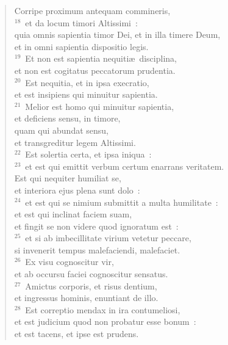  \begin{flushleft}\begin{verse}Corripe proximum antequam commineris,\\
${}^{18}$~et da locum timori Altissimi~:\\ quia omnis sapientia timor Dei, et in illa timere Deum,\\ et in omni sapientia dispositio legis.\\
${}^{19}$~Et non est sapientia nequiti\ae\ disciplina,\\ et non est cogitatus peccatorum prudentia.\\
${}^{20}$~Est nequitia, et in ipsa execratio,\\ et est insipiens qui minuitur sapientia.\\
${}^{21}$~Melior est homo qui minuitur sapientia,\\ et deficiens sensu, in timore,\\ quam qui abundat sensu,\\ et transgreditur legem Altissimi.\\
${}^{22}$~Est solertia certa, et ipsa iniqua~:\\
${}^{23}$~et est qui emittit verbum certum enarrans veritatem.\\ Est qui nequiter humiliat se,\\ et interiora ejus plena sunt dolo~:\\
${}^{24}$~et est qui se nimium submittit a multa humilitate~:\\ et est qui inclinat faciem suam,\\ et fingit se non videre quod ignoratum est~:\\
${}^{25}$~et si ab imbecillitate virium vetetur peccare,\\ si invenerit tempus malefaciendi, malefaciet.\\
${}^{26}$~Ex visu cognoscitur vir,\\ et ab occursu faciei cognoscitur sensatus.\\
${}^{27}$~Amictus corporis, et risus dentium,\\ et ingressus hominis, enuntiant de illo.\\
${}^{28}$~Est correptio mendax in ira contumeliosi,\\ et est judicium quod non probatur esse bonum~:\\ et est tacens, et ipse est prudens.\end{verse}\end{flushleft}


